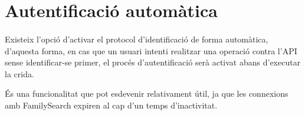 \section{Autentificació automàtica}

    \paragraph{}
    Existeix l’opció d'activar el protocol d'identificació de forma automàtica, d'aquesta forma, en cas que un usuari intenti realitzar una operació contra l’API sense i\-den\-ti\-fi\-car-se primer, el procés d'autentificació serà activat abans d’executar la crida.

    És una funcionalitat que pot esdevenir relativament útil, ja que les connexions amb FamilySearch expiren al cap d'un temps d'inactivitat.
